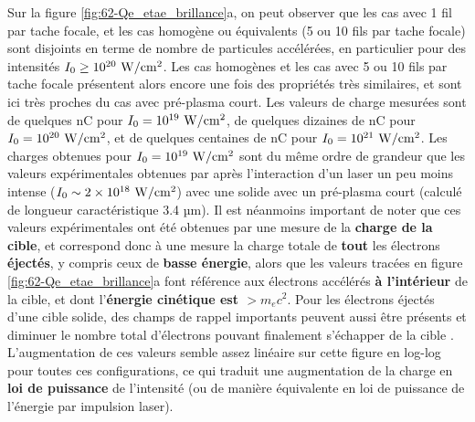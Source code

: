 \begin{refsection}
Sur la figure \ref{fig:62-Qe_etae_brillance}a, on peut observer que les cas avec 1 fil par tache focale, et les cas homogène ou équivalents (5 ou 10 fils par tache focale) sont disjoints en terme de nombre de particules accélérées, en particulier pour des intensités $I_0 \ge 10^{20} ~ \rm W/cm^2$. Les cas homogènes et les cas avec 5 ou 10 fils par tache focale présentent alors encore une fois des propriétés très similaires, et sont ici très proches du cas avec pré-plasma court. Les valeurs de charge mesurées sont de quelques nC pour $I_0 = 10^{19} ~ \rm W/cm^2$, de quelques dizaines de nC pour $I_0 = 10^{20} ~ \rm W/cm^2$, et de quelques centaines de nC pour $I_0 = 10^{21} ~ \rm W/cm^2$. 
Les charges obtenues pour $I_0 = 10^{19} ~ \rm W/cm^2$ sont du même ordre de grandeur que les valeurs expérimentales obtenues par \cite{dubois_2014} après l'interaction d'un laser un peu moins intense ($I_0 \sim 2 \times 10^{18} ~ \rm W/cm^2$) avec une solide avec un pré-plasma court (calculé de longueur caractéristique 3.4 µm). Il est néanmoins important de noter que ces valeurs expérimentales ont été obtenues par une mesure de la \textbf{charge de la cible}, et correspond donc à une mesure la charge totale de \textbf{tout} les électrons \textbf{éjectés}, y compris ceux de \textbf{basse énergie}, alors que les valeurs tracées en figure \ref{fig:62-Qe_etae_brillance}a font référence aux électrons accélérés \textbf{à l'intérieur} de la cible, et dont l'\textbf{énergie cinétique est $>m_e c^2$}. Pour les électrons éjectés d'une cible solide, des champs de rappel importants peuvent aussi être présents et diminuer le nombre total d'électrons pouvant finalement s'échapper de la cible \parencite{link_2011a}. L'augmentation de ces valeurs semble assez linéaire sur cette figure en log-log pour toutes ces configurations, ce qui traduit une augmentation de la charge en \textbf{loi de puissance} de l'intensité (ou de manière équivalente en loi de puissance de l'énergie par impulsion laser).


\end{refsection}

